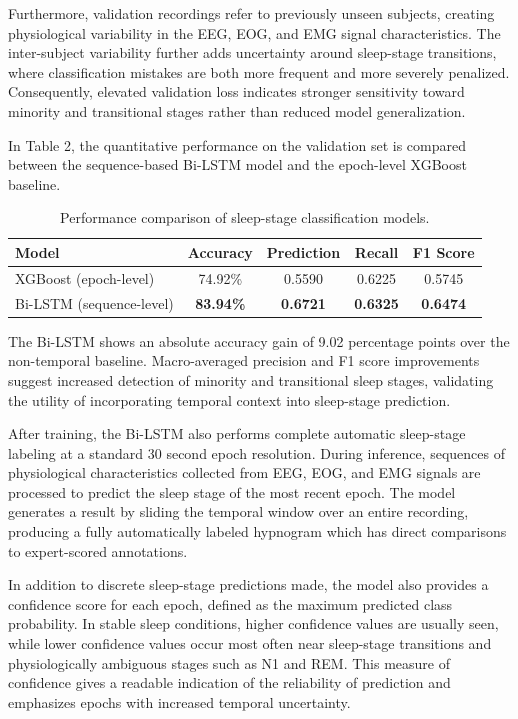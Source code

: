 \documentclass[10pt]{cai26}
\begin{document}
Furthermore, validation recordings refer to previously unseen subjects, creating physiological variability in the EEG, EOG, and 
EMG signal characteristics. The inter-subject variability further adds uncertainty around sleep-stage transitions, where 
classification mistakes are both more frequent and more severely penalized. Consequently, elevated validation loss indicates 
stronger sensitivity toward minority and transitional stages rather than reduced model generalization. 

In Table 2, the quantitative performance on the validation set is compared between the sequence-based Bi-LSTM model and the 
epoch-level XGBoost baseline.

\begin{table}[H]
\centering
\caption{Performance comparison of sleep-stage classification models.}
\label{tab:model_perf}
\renewcommand{\arraystretch}{1.15}
\setlength{\tabcolsep}{6pt}
\begin{tabular}{|l|c|c|c|c|}
\hline
\textbf{Model} & \textbf{Accuracy} & \textbf{Prediction} & \textbf{Recall} & \textbf{F1 Score} \\
\hline
XGBoost (epoch-level) & 74.92\% & 0.5590 & 0.6225 & 0.5745 \\
Bi-LSTM (sequence-level) & \textbf{83.94\%} & \textbf{0.6721} & \textbf{0.6325} & \textbf{0.6474} \\
\hline
\end{tabular}
\end{table}

The Bi-LSTM shows an absolute accuracy gain of 9.02 percentage points over the non-temporal baseline. Macro-averaged precision 
and F1 score improvements suggest increased detection of minority and transitional sleep stages, validating the utility of 
incorporating temporal context into sleep-stage prediction. 

After training, the Bi-LSTM also performs complete automatic sleep-stage labeling at a standard 30 second epoch resolution. During 
inference, sequences of physiological characteristics collected from EEG, EOG, and EMG signals are processed to predict the sleep 
stage of the most recent epoch. The model generates a result by sliding the temporal window over an entire recording, producing a 
fully automatically labeled hypnogram which has direct comparisons to expert-scored annotations. 

In addition to discrete sleep-stage predictions made, the model also provides a confidence score for each epoch, defined as the 
maximum predicted class probability. In stable sleep conditions, higher confidence values are usually seen, while lower confidence 
values occur most often near sleep-stage transitions and physiologically ambiguous stages such as N1 and REM. This measure of 
confidence gives a readable indication of the reliability of prediction and emphasizes epochs with increased temporal uncertainty.
\end{document}
